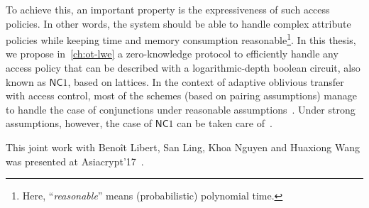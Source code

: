 To achieve this, an important property is the expressiveness of such access policies.
In other words, the system should be able to handle complex attribute policies while keeping time and memory consumption reasonable\footnote{Here, ``\textit{reasonable}'' means (probabilistic) polynomial time.}.
In this thesis, we propose in~\cref{ch:ot-lwe} a zero-knowledge protocol to efficiently handle any access policy that can be described with a logarithmic-depth boolean circuit, also known as $\mathsf{NC}1$, based on lattices.
In the context of adaptive oblivious transfer with access control, most of the schemes (based on pairing assumptions) manage to handle the case of conjunctions under reasonable assumptions~\cite{CDN09,CDNZ11,ACDN13}. Under strong assumptions, however, the case of $\mathsf{NC}1$ can be taken care of~\cite{ZAW+10}.

This joint work with Benoît Libert, San Ling, Khoa Nguyen and Huaxiong Wang was presented at Asiacrypt'17~\cite{LLM+17}. 
